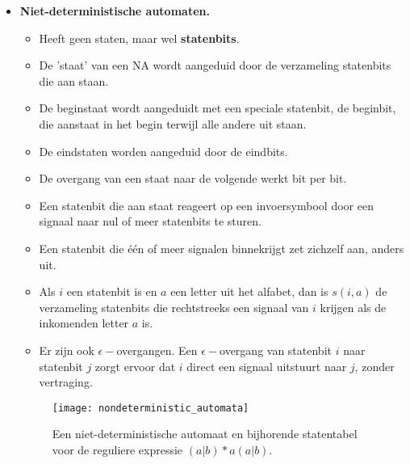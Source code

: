 \begin{itemize}
    \item \textbf{Niet-deterministische automaten.}
    \begin{itemize}
        \item Heeft geen staten, maar wel \textbf{statenbits}.
        \item De 'staat' van een NA wordt aangeduid door de verzameling statenbits die aan staan.
        \item De beginstaat wordt aangeduidt met een speciale statenbit, de beginbit, die aanstaat in het begin terwijl alle andere uit staan.
        \item De eindstaten worden aangeduid door de eindbits.
        \item De overgang van een staat naar de volgende werkt bit per bit.
        \item Een statenbit die aan staat reageert op een invoersymbool door een signaal naar nul of meer statenbits te sturen.
        \item Een statenbit die één of meer signalen binnekrijgt zet zichzelf aan, anders uit.
        \item Als $i$ een statenbit is en $a$ een letter uit het alfabet, dan is $s(i, a)$ de verzameling statenbits die rechtstreeks een signaal van $i$ krijgen als de inkomenden letter $a$ is.
        \item Er zijn ook $\epsilon-$overgangen. Een $\epsilon-$overgang van statenbit $i$ naar statenbit $j$ zorgt ervoor dat $i$ direct een signaal uitstuurt naar $j$, zonder vertraging.
    \end{itemize}

    \begin{figure}[ht]
        \centering
        \texttt{[image: nondeterministic\_automata]}
        \caption{Een niet-deterministische automaat en bijhorende statentabel voor de reguliere expressie $(a|b)*a(a|b)$.}
        \label{fig:nondeterministic_automata}
    \end{figure}
\end{itemize}

